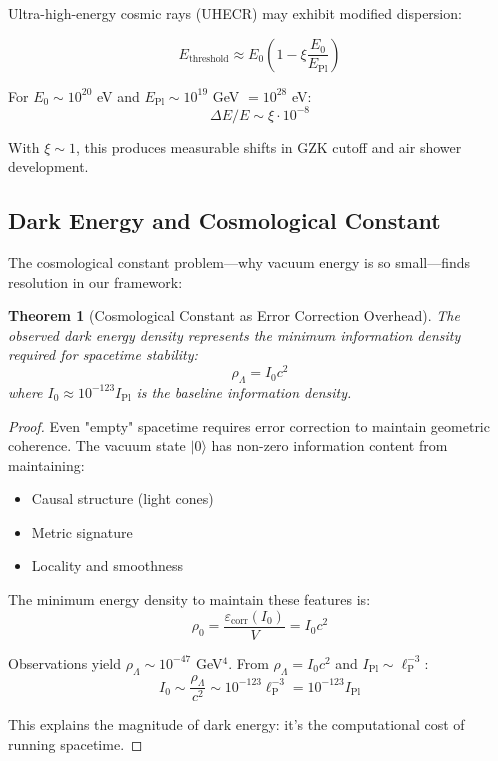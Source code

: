 \documentclass[12pt,a4paper]{article}
\newtheorem{theorem}{Theorem}[section]
\theoremstyle{remark}
\newcommand{\lP}{\ell_{\text{P}}}
\begin{document}
Ultra-high-energy cosmic rays (UHECR) may exhibit modified dispersion:

\begin{equation}
E_{\text{threshold}} \approx E_0\left(1 - \xi\frac{E_0}{E_{\text{Pl}}}\right)
\end{equation}

For $E_0 \sim 10^{20}$ eV and $E_{\text{Pl}} \sim 10^{19}$ GeV $= 10^{28}$ eV:
\begin{equation}
\Delta E/E \sim \xi \cdot 10^{-8}
\end{equation}

With $\xi \sim 1$, this produces measurable shifts in GZK cutoff and air shower development.

\subsection{Dark Energy and Cosmological Constant}
\label{sec:darkenergy}

The cosmological constant problem—why vacuum energy is so small—finds resolution in our framework:

\begin{theorem}[Cosmological Constant as Error Correction Overhead]
The observed dark energy density represents the minimum information density required for spacetime stability:
\begin{equation}
\rho_\Lambda = I_0 c^2
\end{equation}
where $I_0 \approx 10^{-123} I_{\text{Pl}}$ is the baseline information density.
\end{theorem}

\begin{proof}
Even "empty" spacetime requires error correction to maintain geometric coherence. The vacuum state $|0\rangle$ has non-zero information content from maintaining:
\begin{itemize}
\item Causal structure (light cones)
\item Metric signature
\item Locality and smoothness
\end{itemize}

The minimum energy density to maintain these features is:
\begin{equation}
\rho_0 = \frac{\varepsilon_{\text{corr}}(I_0)}{V} = I_0 c^2
\end{equation}

Observations yield $\rho_\Lambda \sim 10^{-47}$ GeV$^4$. From $\rho_\Lambda = I_0 c^2$ and $I_{\text{Pl}} \sim \lP^{-3}$:
\begin{equation}
I_0 \sim \frac{\rho_\Lambda}{c^2} \sim 10^{-123} \lP^{-3} = 10^{-123} I_{\text{Pl}}
\end{equation}

This explains the magnitude of dark energy: it's the computational cost of running spacetime.
\end{proof}
\end{document}
